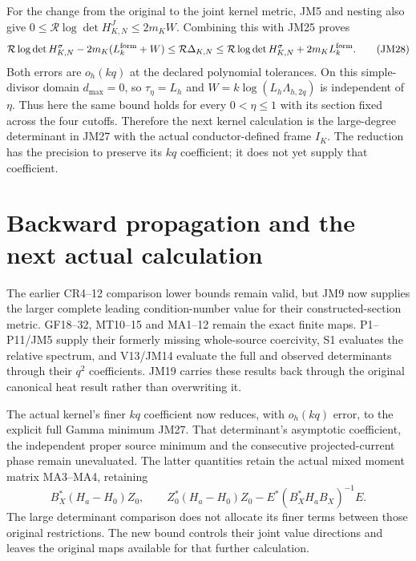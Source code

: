 \documentclass[11pt]{article}
\begin{document}
For the change from the original to the joint kernel metric,
JM5 and nesting also give
$0\le\mathcal R\log\det H_{K,N}^J\le2m_KW$.
Combining this with JM25 proves
\[
 \mathcal R\log\det H_{K,N}^\sigma-2m_K(L_k^{\rm form}+W)
 \le\mathcal R\Delta_{K,N}
 \le\mathcal R\log\det H_{K,N}^\sigma+2m_KL_k^{\rm form}.
 \tag{JM28}
\]
Both errors are $o_h(kq)$ at the declared polynomial tolerances.
On this simple-divisor domain $d_{\max}=0$, so
$\tau_\eta=L_h$ and $W=k\log(L_h\Lambda_{h,2q})$ is independent of
$\eta$. Thus here the same bound holds for every $0<\eta\le1$
with its section fixed across the four cutoffs.
Therefore the next kernel calculation is the large-degree
determinant in JM27 with the actual conductor-defined frame $I_K$.
The reduction has the precision to preserve its $kq$ coefficient;
it does not yet supply that coefficient.

\section{Backward propagation and the next actual calculation}
The earlier CR4--12 comparison lower bounds remain valid, but JM9
now supplies the larger complete leading condition-number value
for their constructed-section metric. GF18--32, MT10--15 and MA1--12
remain the exact finite maps. P1--P11/JM5 supply their formerly
missing whole-source coercivity, S1 evaluates the relative spectrum,
and V13/JM14 evaluate the full and observed determinants through
their $q^2$ coefficients. JM19 carries these results back through
the original canonical heat result rather than overwriting it.

The actual kernel's finer $kq$ coefficient now reduces, with
$o_h(kq)$ error, to the explicit full Gamma minimum JM27.
That determinant's asymptotic coefficient, the independent proper
source minimum and the consecutive projected-current phase remain
unevaluated. The latter quantities retain the actual mixed
moment matrix MA3--MA4, retaining
\[
 B_X^*(H_a-H_0)Z_0,\qquad
 Z_0^*(H_a-H_0)Z_0-E^*(B_X^*H_aB_X)^{-1}E.\tag{JM20}
\]
The large determinant comparison does not allocate its finer terms
between those original restrictions. The new bound controls their
joint value directions and leaves the original maps available for
that further calculation.
\end{document}
